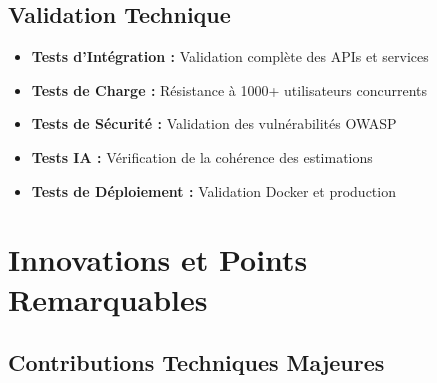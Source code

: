 \subsection{Validation Technique}

\begin{itemize}
    \item \textbf{Tests d'Intégration :} Validation complète des APIs et services
    \item \textbf{Tests de Charge :} Résistance à 1000+ utilisateurs concurrents
    \item \textbf{Tests de Sécurité :} Validation des vulnérabilités OWASP
    \item \textbf{Tests IA :} Vérification de la cohérence des estimations
    \item \textbf{Tests de Déploiement :} Validation Docker et production
\end{itemize}


\section{Innovations et Points Remarquables}

\subsection{Contributions Techniques Majeures}

